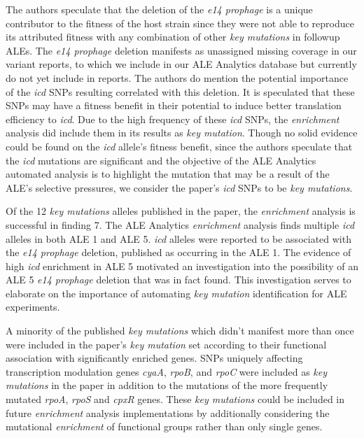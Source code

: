 \documentclass[12pt,final,masters,chapterheads]{ucsd}  %
\begin{document}
The authors speculate that the deletion of the \textit{e14 prophage} is a unique contributor to the fitness of the host strain since they were not able to reproduce its attributed fitness with any combination of other \textit{key mutations} in followup ALEs. The \textit{e14 prophage} deletion manifests as unassigned missing coverage in our variant reports, to which we include in our ALE Analytics database but currently do not yet include in reports. The authors do mention the potential importance of the \textit{icd} SNPs resulting correlated with this deletion. It is speculated that these SNPs may have a fitness benefit in their potential to induce better translation efficiency to \textit{icd}. Due to the high frequency of these \textit{icd} SNPs, the \textit{enrichment} analysis did include them in its results as \textit{key mutation}. Though no solid evidence could be found on the \textit{icd} allele's fitness benefit, since the authors speculate that the \textit{icd} mutations are significant and the objective of the ALE Analytics automated analysis is to highlight the mutation that may be a result of the ALE's selective pressures, we consider the paper's \textit{icd} SNPs to be \textit{key mutations}.

Of the 12 \textit{key mutations} alleles published in the paper, the \textit{enrichment} analysis is successful in finding 7. The ALE Analytics \textit{enrichment} analysis finds multiple \textit{icd} alleles in both ALE 1 and ALE 5. \textit{icd} alleles were reported to be associated with the \textit{e14 prophage } deletion, published as occurring in the ALE 1. The evidence of high \textit{icd} enrichment in ALE 5 motivated an investigation into the possibility of an ALE 5 \textit{e14 prophage} deletion that was in fact found. This investigation serves to elaborate on the importance of automating \textit{key mutation} identification for ALE experiments.

A minority of the published \textit{key mutations} which didn't manifest more than once were included in the paper's \textit{key mutation} set according to their functional association with significantly enriched genes. SNPs uniquely affecting transcription modulation genes \textit{cyaA}, \textit{rpoB}, and \textit{rpoC} were included as \textit{key mutations} in the paper in addition to the mutations of the more frequently mutated \textit{rpoA}, \textit{rpoS} and \textit{cpxR} genes. These \textit{key mutations} could be included in future \textit{enrichment} analysis implementations by additionally considering the mutational \textit{enrichment} of functional groups rather than only single genes.
\end{document}
